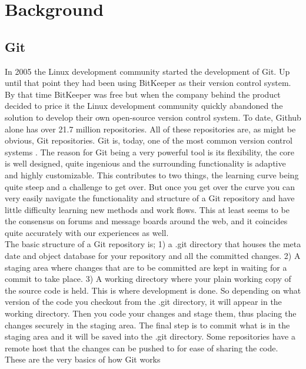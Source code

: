 \documentclass[a4paper,oneside]{bth} %
\begin{document}
		\chapter{Background}
			\section{Git}
			In 2005 the Linux development community started the development of Git.
			Up until that point they had been using BitKeeper as their version control system. By that time BitKeeper was free but when the company behind the product decided to price it the Linux development community quickly abandoned the solution to develop their own open-source version control system.\cite{ProGit}
			To date, Github alone has over 21.7 million repositories.\cite{GithubAbout} All of these repositories are, as might be obvious, Git repositories. 
			Git is, today, one of the most common version control systems \cite{EclipseDeveoperReport}\cite{DeveloperProductivity}\cite{MicrosoftSurveyResults}. The reason for Git being a very powerful tool is its flexibility, the core is well designed, quite ingenious and the surrounding functionality is adaptive and highly customizable. This contributes to two things, the learning curve being quite steep and a challenge to get over. But once you get over the curve you can very easily navigate the functionality and structure of a Git repository and have little difficulty learning new methods and work flows. This at least seems to be the consensus on forums and message boards around the web, and it coincides quite accurately with our experiences as well.
			\\
			The basic structure of a Git repository is; 1) a .git directory that houses the meta date and object database for your repository and all the committed changes. 2) A staging area where changes that are to be committed are kept in waiting for a commit to take place. 3) A working directory where your plain working copy of the source code is held. This is where development is done. \cite{GitStructure} 
			So depending on what version of the code you checkout from the .git directory, it will appear in the working directory. Then you code your changes and stage them, thus placing the changes securely in the staging area. The final step is to commit what is in the staging area and it will be saved into the .git directory. Some repositories have a remote host that the changes can be pushed to for ease of sharing the code. These are the very basics of how Git works \cite{GitStructure}
			
\end{document}
